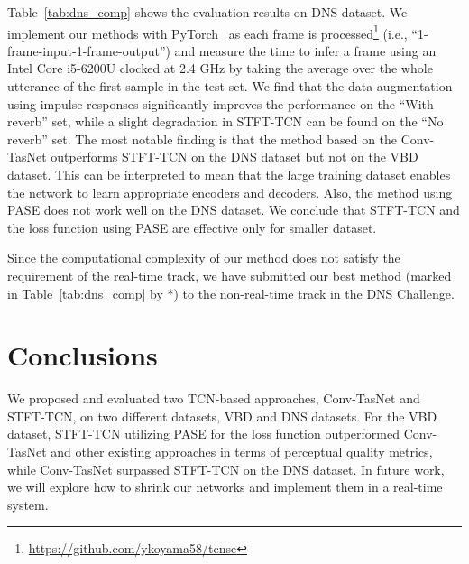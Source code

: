 \documentclass[a4paper]{article}
\begin{document}
\begin{spacing}{0.915}
Table~\ref{tab:dns_comp} shows the evaluation results on DNS dataset.
We implement our methods with PyTorch~\cite{paszke2017automatic} as each frame is processed\footnote{
\url{https://github.com/ykoyama58/tcnse}} (i.e., ``1-frame-input-1-frame-output'')
 and measure the time to infer a frame using an Intel Core i5-6200U clocked at 2.4 GHz by taking the average over the whole utterance of the first sample in the test set. 
We find that the data augmentation using impulse responses significantly improves the performance on the ``With reverb'' set, while a slight degradation in STFT-TCN can be found on the ``No reverb'' set.
The most notable finding is that the method based on the Conv-TasNet outperforms STFT-TCN on the DNS dataset but not on the VBD dataset.
This can be interpreted to mean that the large training dataset enables the network to learn appropriate encoders and decoders.
Also, the method using PASE does not work well on the DNS dataset.
We conclude that STFT-TCN and the loss function using PASE are effective only for smaller dataset.

Since the computational complexity of our method does not satisfy the requirement of the real-time track, we have submitted our best method (marked in Table~\ref{tab:dns_comp} by *) to the non-real-time track in the DNS Challenge.


\section{Conclusions}
We proposed and evaluated two TCN-based approaches, Conv-TasNet and STFT-TCN, on two different datasets, VBD and DNS datasets.
For the VBD dataset, STFT-TCN utilizing PASE for the loss function outperformed Conv-TasNet and other existing approaches in terms of perceptual quality metrics, while Conv-TasNet surpassed STFT-TCN on the DNS dataset.
In future work, we will explore how to shrink our networks and implement them in a real-time system.

\end{spacing}





\end{document}
